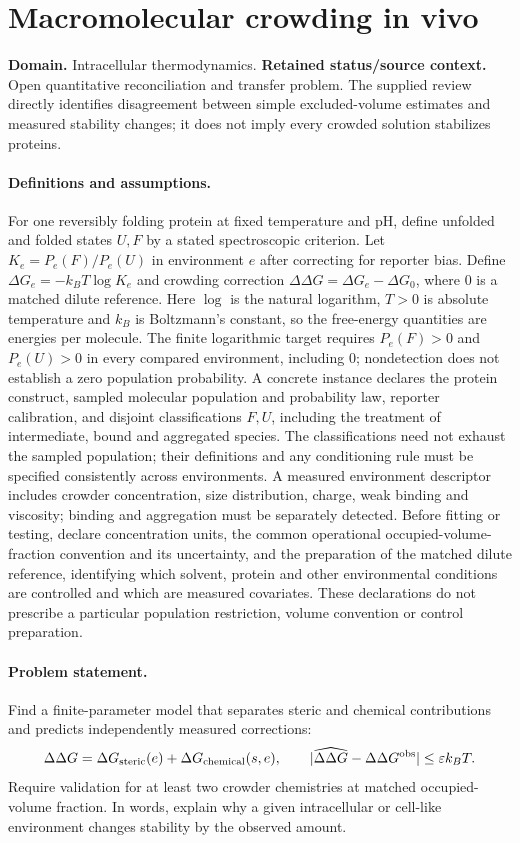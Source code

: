 \documentclass[11pt]{article}
\begin{document}
\section*{Macromolecular crowding in vivo}
\label{prob:007}
\label{rank:119}
\par\smallskip

\noindent\textbf{Domain.} Intracellular thermodynamics. \quad \textbf{Retained status/source context.} Open quantitative reconciliation and transfer problem. The supplied review directly identifies disagreement between simple excluded-volume estimates and measured stability changes; it does not imply every crowded solution stabilizes proteins.
\paragraph{Definitions and assumptions.} For one reversibly folding protein at fixed temperature and pH, define unfolded and folded states $U,F$ by a stated spectroscopic criterion. Let $K_e=P_e(F)/P_e(U)$ in environment $e$ after correcting for reporter bias. Define $\Delta G_e=-k_BT\log K_e$ and crowding correction $\Delta\Delta G=\Delta G_e-\Delta G_0$, where $0$ is a matched dilute reference. Here $\log$ is the natural logarithm, $T>0$ is absolute temperature and $k_B$ is Boltzmann's constant, so the free-energy quantities are energies per molecule. The finite logarithmic target requires $P_e(F)>0$ and $P_e(U)>0$ in every compared environment, including $0$; nondetection does not establish a zero population probability. A concrete instance declares the protein construct, sampled molecular population and probability law, reporter calibration, and disjoint classifications $F,U$, including the treatment of intermediate, bound and aggregated species. The classifications need not exhaust the sampled population; their definitions and any conditioning rule must be specified consistently across environments. A measured environment descriptor includes crowder concentration, size distribution, charge, weak binding and viscosity; binding and aggregation must be separately detected. Before fitting or testing, declare concentration units, the common operational occupied-volume-fraction convention and its uncertainty, and the preparation of the matched dilute reference, identifying which solvent, protein and other environmental conditions are controlled and which are measured covariates. These declarations do not prescribe a particular population restriction, volume convention or control preparation.
\paragraph{Problem statement.} Find a finite-parameter model that separates steric and chemical contributions and predicts independently measured corrections:
\[
\Delta\Delta G=\Delta G_{\rm steric}(e)+\Delta G_{\rm chemical}(s,e),\qquad
|\widehat{\Delta\Delta G}-\Delta\Delta G^{\rm obs}|\leq\varepsilon k_BT.
\]
Require validation for at least two crowder chemistries at matched occupied-volume fraction. In words, explain why a given intracellular or cell-like environment changes stability by the observed amount.
\end{document}
